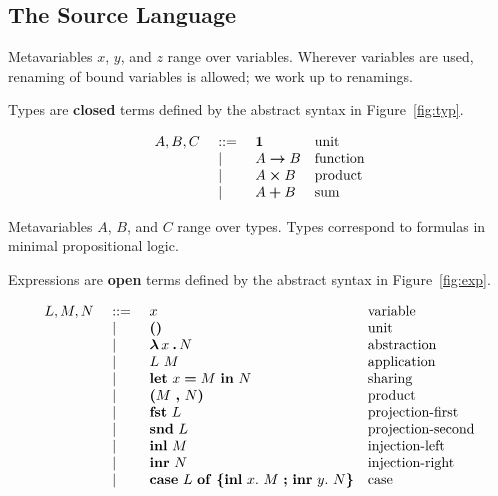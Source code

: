 \newcommand{\nv}{P}
\newcommand{\na}{L^{\text{\textcrlambda}}}

\subsection{The Source Language}
Metavariables $x$, $y$, and $z$ range over variables. Wherever
variables are used, renaming of bound variables is allowed;
we work up to renamings.

Types are \textbf{closed} terms defined by the abstract syntax in
Figure~\ref{fig:typ}.

\begin{figure*}[h]
\[\uncolored
\begin{array}{llll}
A,B,C & \mathbin{\ ::=\ }
         & \typone       & \textrm{unit}         \\
& \ |\ \ & \typarr{A}{B} & \textrm{function}  \\
& \ |\ \ & \typprd{A}{B} & \textrm{product}      \\
& \ |\ \ & \typsum{A}{B} & \textrm{sum}
\end{array}
\]
\caption{Types}
\label{fig:typ}
\end{figure*}

Metavariables $A$, $B$, and $C$ range over types. Types
correspond to formulas in minimal propositional logic.

Expressions are \textbf{open} terms defined by the abstract syntax in
Figure~\ref{fig:exp}.

\begin{figure*}[h]
\[\uncolored
\begin{array}{llll}
L,M,N & \mathbin{\ ::=\ }
         & \expvar{x}             & \textrm{variable}          \\
& \ |\ \ & \expunt                & \textrm{unit}              \\
& \ |\ \ & \expabs{x}{A}{N}       & \textrm{abstraction}       \\
& \ |\ \ & \expapp{L}{M}          & \textrm{application}       \\
& \ |\ \ & \expshr{x}{M}{N}       & \textrm{sharing}           \\
& \ |\ \ & \expprd{M}{N}          & \textrm{product}           \\
& \ |\ \ & \expfst{L}             & \textrm{projection-first}  \\
& \ |\ \ & \expsnd{L}             & \textrm{projection-second} \\
& \ |\ \ & \explft{M}{\tm{B}}     & \textrm{injection-left}    \\
& \ |\ \ & \exprgt{\tm{A}}{N}     & \textrm{injection-right}   \\
& \ |\ \ & \expcas{L}{x}{M}{y}{N} & \textrm{case}
\end{array}
\]
\caption{Expressions}
\label{fig:exp}
\end{figure*}

